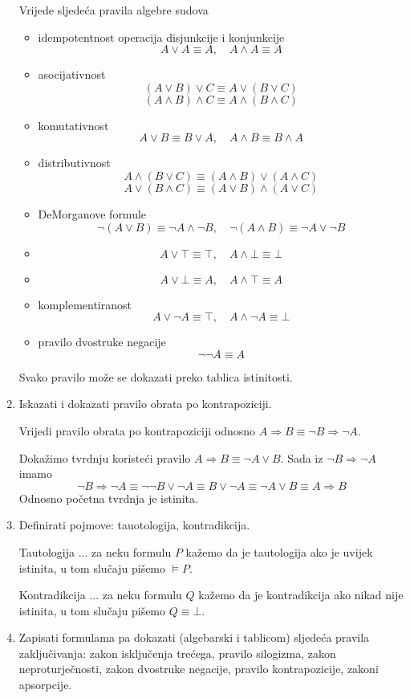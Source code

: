 \documentclass{article}
\begin{document}
\begin{enumerate}
Vrijede sljedeća pravila algebre sudova
\begin{itemize}
\item idempotentnost operacija disjunkcije i konjunkcije
$$A\lor A\equiv A,\quad A\land A\equiv A$$
\item asocijativnost
$$(A\lor B)\lor C\equiv A\lor (B\lor C)$$
$$(A\land B)\land C\equiv A\land (B\land C)$$
\item komutativnost
$$A\lor B\equiv B\lor A,\quad A\land B\equiv B\land A$$
\item distributivnost
$$A\land (B\lor C)\equiv (A\land B)\lor (A\land C)$$
$$A\lor (B\land C)\equiv (A\lor B)\land (A\lor C)$$
\item DeMorganove formule
$$\neg (A\lor B)\equiv \neg A\land\neg B,\quad\neg (A\land B)\equiv \neg A\lor\neg B$$
\item $$A\lor\top\equiv\top,\quad A\land\bot\equiv\bot$$
\item $$A\lor\bot\equiv A,\quad A\land\top\equiv A$$
\item komplementiranost
$$A\lor\neg A\equiv\top,\quad A\land\neg A\equiv\bot$$
\item pravilo dvostruke negacije
$$\neg\neg A\equiv A$$
\end{itemize}

Svako pravilo može se dokazati preko tablica istinitosti.

\item Iskazati i dokazati pravilo obrata po kontrapoziciji.

Vrijedi pravilo obrata po kontrapoziciji odnosno $A\Rightarrow B\equiv \neg B\Rightarrow\neg A$.

Dokažimo tvrdnju koristeći pravilo $A\Rightarrow B\equiv\neg A\lor B$. Sada iz $\neg B\Rightarrow\neg A$ imamo $$\neg B\Rightarrow\neg A\equiv\neg\neg B\lor\neg A\equiv B\lor\neg A\equiv\neg A\lor B\equiv A\Rightarrow B$$
Odnosno početna tvrdnja je istinita.


\item Definirati pojmove: tauotologija, kontradikcija.

Tautologija ... za neku formulu $P$ kažemo da je tautologija ako je uvijek istinita, u tom slučaju pišemo $\vDash P$.

Kontradikcija ... za neku formulu $Q$ kažemo da je kontradikcija ako nikad nije istinita, u tom slučaju pišemo $Q\equiv\bot$.

\item Zapisati formulama pa dokazati (algebarski i tablicom) sljedeća pravila zaključivanja: zakon isključenja trećega, pravilo silogizma, zakon neproturječnosti, zakon dvostruke negacije, pravilo kontrapozicije, zakoni apsorpcije.


\end{enumerate}
\end{document}
